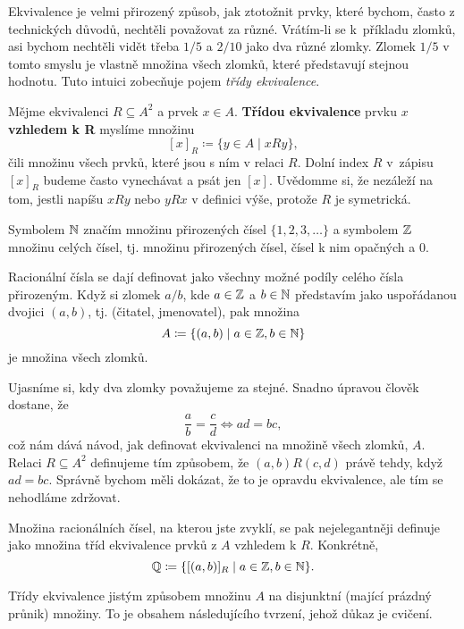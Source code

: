 Ekvivalence je velmi přirozený způsob, jak ztotožnit prvky, které bychom, často
z technických důvodů, nechtěli považovat za různé. Vrátím-li se k~příkladu
zlomků, asi bychom nechtěli vidět třeba $1 / 5$ a $2 / 10$ jako dva různé
zlomky. Zlomek $1 / 5$ v tomto smyslu je vlastně množina všech zlomků, které
představují stejnou hodnotu. Tuto intuici zobecňuje pojem \emph{třídy
ekvivalence}.

\begin{definition}
 Mějme ekvivalenci $R \subseteq A^2$ a prvek $x \in A$. \textbf{Třídou
 ekvivalence} prvku $x$ \textbf{vzhledem k R} myslíme množinu
 \[
  [x]_{R} \coloneqq \{y \in A \mid xRy\},
 \]
 čili množinu všech prvků, které jsou s ním v relaci $R$. Dolní index $R$
 v~zápisu $[x]_R$ budeme často vynechávat a psát jen $[x]$. Uvědomme si, že
 nezáleží na tom, jestli napíšu $xRy$ nebo $yRx$ v definici výše, protože $R$ je
 symetrická.
\end{definition}

\begin{example}
 Symbolem $\mathbb{N}$ značím množinu přirozených čísel $\{1,2,3,\ldots\}$ a symbolem
 $\mathbb{Z}$ množinu celých čísel, tj. množinu přirozených čísel, čísel k nim opačných
 a $0$.

 Racionální čísla se dají definovat jako všechny možné podíly celého čísla
 přirozeným. Když si zlomek $a / b$, kde  $a \in \mathbb{Z}$ a $b \in \mathbb{N}$ představím
 jako uspořádanou dvojici $(a,b)$, tj. (čitatel, jmenovatel), pak množina
 \[
  A \coloneqq \{(a,b) \mid a \in \mathbb{Z}, b \in \mathbb{N}\}
 \]
 je množina všech zlomků.

 Ujasníme si, kdy dva zlomky považujeme za stejné. Snadno úpravou člověk
 dostane, že
 \[
  \frac{a}{b} = \frac{c}{d} \iff ad = bc,
 \]
 což nám dává návod, jak definovat ekvivalenci na množině všech zlom\-ků, $A$.
 Relaci $R \subseteq A^2$ definujeme tím způsobem, že $(a,b)R(c,d)$ právě tehdy,
 když $ad = bc$. Správně bychom měli dokázat, že to je opravdu ekvivalence, ale
 tím se nehodláme zdržovat.

 Množina racionálních čísel, na kterou jste zvyklí, se pak nejelegantněji
 definuje jako množina tříd ekvivalence prvků z $A$ vzhledem k $R$. Konkrétně,
 \[
  \mathbb{Q} \coloneqq \{[(a, b)]_R \mid a \in \mathbb{Z},b \in \mathbb{N}\}.
 \]
\end{example}

Třídy ekvivalence jistým způsobem  množinu $A$ na disjunktní
(mající prázdný průnik) množiny. To je obsahem následujícího tvrzení, jehož
důkaz je cvičení.

